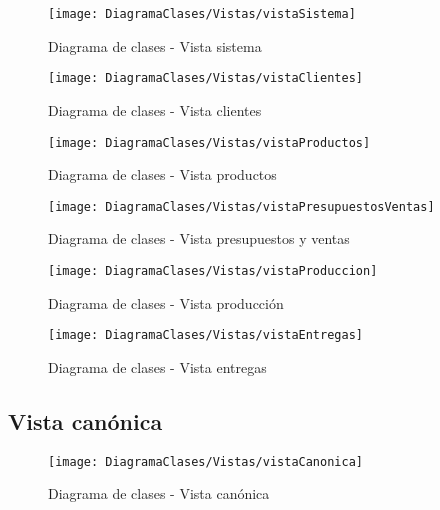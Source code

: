 	\begin{figure}[H]
		\centering
		\texttt{[image: DiagramaClases/Vistas/vistaSistema]}
		\caption{Diagrama de clases - Vista sistema}
	\label{fig:Diagrama de clases - Vista sistema}
	\end{figure}

	\begin{figure}[H]
		\centering
		\texttt{[image: DiagramaClases/Vistas/vistaClientes]}
		\caption{Diagrama de clases - Vista clientes}
	\label{fig:Diagrama de clases - Vista clientes}
    \end{figure}
	\begin{figure}[H]
		\centering
		\texttt{[image: DiagramaClases/Vistas/vistaProductos]}
		\caption{Diagrama de clases - Vista productos}
	\label{fig:Diagrama de clases - Vista productos}
	\end{figure}
	
	\begin{figure}[H]
		\centering
		\texttt{[image: DiagramaClases/Vistas/vistaPresupuestosVentas]}
		\caption{Diagrama de clases - Vista presupuestos y ventas}
	\label{fig:Diagrama de clases - Vista presupuestos y ventas}
	\end{figure}

	\begin{figure}[H]
		\centering
		\texttt{[image: DiagramaClases/Vistas/vistaProduccion]}
		\caption{Diagrama de clases - Vista producción}
	\label{fig:Diagrama de clases - Vista producción}
	\end{figure}

	\begin{figure}[H]
		\centering
		\texttt{[image: DiagramaClases/Vistas/vistaEntregas]}
		\caption{Diagrama de clases - Vista entregas}
	\label{fig:Diagrama de clases - Vista entregas}
	\end{figure}

	\subsection{Vista canónica}
	\begin{figure}[H]
		\centering
		\texttt{[image: DiagramaClases/Vistas/vistaCanonica]}
		\caption{Diagrama de clases - Vista canónica}
	\label{fig:Modelo de clases - Vista canónica}
	\end{figure}

